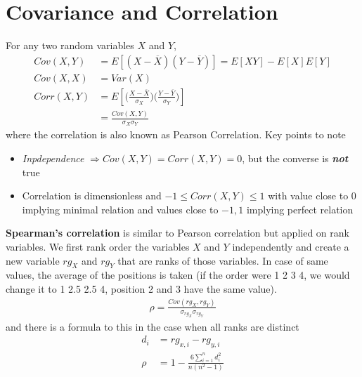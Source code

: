 \documentclass[../probability-notes.tex]{subfiles}
\begin{document}
    \section{Covariance and Correlation}
    For any two random variables $X$ and $Y$,
    \begin{align*}
        Cov(X,Y) &= E[(X - \overline{X})(Y - \overline{Y})] = E[XY] - E[X]E[Y]\\
        Cov(X,X) &= Var(X)\\
        Corr(X,Y) &= E[\bigg(\frac{X - \overline{X}}{\sigma_{X}}\bigg) \bigg(\frac{Y - \overline{Y}}{\sigma_{Y}}\bigg)]\\
        &= \frac{Cov(X,Y)}{\sigma_{X} \sigma_{Y}}
    \end{align*}
    where the correlation is also known as Pearson Correlation. Key points to note
    \begin{itemize}
        \item \emph{Inpdependence} $\Rightarrow Cov(X,Y) = Corr(X,Y) = 0$, but the converse is \emph{\textbf{not}} true
        \item Correlation is dimensionless and $-1 \leq Corr(X,Y) \leq 1$ with value close to $0$ implying minimal relation and values close to $-1, 1$ implying perfect relation
    \end{itemize}

    \textbf{Spearman's correlation} is similar to Pearson correlation but applied on rank variables. We first rank order the variables $X$ and $Y$ independently and create a new variable $rg_{X}$ and $rg_{Y}$ that are ranks of those variables. In case of same values, the average of the positions is taken (if the order were 1 2 3 4, we would change it to 1 2.5 2.5 4, position 2 and 3 have the same value).
    \begin{align*}
        \rho = \frac{Cov(rg_{X}, rg_{Y})}{\sigma_{rg_{X}} \sigma_{rg_{Y}}}
    \end{align*}
    and there is a formula to this in the case when all ranks are distinct
    \begin{align*}
        d_{i} &= rg_{x,i} - rg_{y,i}\\
        \rho &= 1 - \frac{6\sum_{i=1}^{n} d_{i}^{2}}{n(n^{2} - 1)}
    \end{align*}
\end{document}
